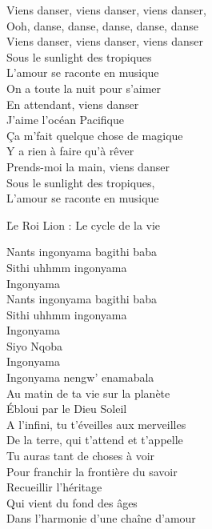 \documentclass{novel}
\begin{document}
\begin{multicols}{2}
Viens danser, viens danser, viens danser, \\
Ooh, danse, danse, danse, danse, danse \\
Viens danser, viens danser, viens danser \\
Sous le sunlight des tropiques \\
L'amour se raconte en musique \\
On a toute la nuit pour s'aimer \\

En attendant, viens danser \\
J'aime l'océan Pacifique \\
Ça m'fait quelque chose de magique \\
Y a rien à  faire qu'à  rêver \\
Prends-moi la main, viens danser \\
Sous le sunlight des tropiques, \\
L'amour se raconte en musique
\end{multicols}

\newpage
\normalsize
\h*{Le Roi Lion : Le cycle de la vie}

Nants ingonyama bagithi baba \\
Sithi uhhmm ingonyama \\
Ingonyama \\

Nants ingonyama bagithi baba \\
Sithi uhhmm ingonyama \\
Ingonyama \\

Siyo Nqoba \\
Ingonyama \\
Ingonyama nengw' enamabala \\

Au matin de ta vie sur la planète \\
Ébloui par le Dieu Soleil \\
A l'infini, tu t'éveilles aux merveilles \\
De la terre, qui t'attend et t'appelle \\

Tu auras tant de choses à voir \\
Pour franchir la frontière du savoir \\
Recueillir l'héritage \\
Qui vient du fond des âges \\
Dans l'harmonie d'une chaîne d'amour \\
\end{document}
